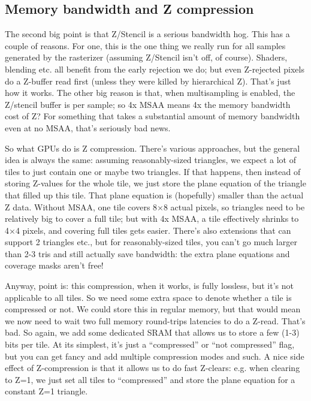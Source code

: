 \documentclass[12pt]{article}
\begin{document}
\subsection{Memory bandwidth and Z compression}
\label{sec:org8647eb3}

The second big point is that Z/Stencil is a serious bandwidth hog. This has a couple of reasons. For one, this is the one thing we really run for all samples generated by the rasterizer (assuming Z/Stencil isn’t off, of course). Shaders, blending etc. all benefit from the early rejection we do; but even Z-rejected pixels do a Z-buffer read first (unless they were killed by hierarchical Z). That’s just how it works. The other big reason is that, when multisampling is enabled, the Z/stencil buffer is per sample; so 4x MSAA means 4x the memory bandwidth cost of Z? For something that takes a substantial amount of memory bandwidth even at no MSAA, that’s seriously bad news.

So what GPUs do is Z compression. There’s various approaches, but the general idea is always the same: assuming reasonably-sized triangles, we expect a lot of tiles to just contain one or maybe two triangles. If that happens, then instead of storing Z-values for the whole tile, we just store the plane equation of the triangle that filled up this tile. That plane equation is (hopefully) smaller than the actual Z data. Without MSAA, one tile covers 8×8 actual pixels, so triangles need to be relatively big to cover a full tile; but with 4x MSAA, a tile effectively shrinks to 4×4 pixels, and covering full tiles gets easier. There’s also extensions that can support 2 triangles etc., but for reasonably-sized tiles, you can’t go much larger than 2-3 tris and still actually save bandwidth: the extra plane equations and coverage masks aren’t free!

Anyway, point is: this compression, when it works, is fully lossless, but it’s not applicable to all tiles. So we need some extra space to denote whether a tile is compressed or not. We could store this in regular memory, but that would mean we now need to wait two full memory round-trips latencies to do a Z-read. That’s bad. So again, we add some dedicated SRAM that allows us to store a few (1-3) bits per tile. At its simplest, it’s just a “compressed” or “not compressed” flag, but you can get fancy and add multiple compression modes and such. A nice side effect of Z-compression is that it allows us to do fast Z-clears: e.g. when clearing to Z=1, we just set all tiles to “compressed” and store the plane equation for a constant Z=1 triangle.
\end{document}
